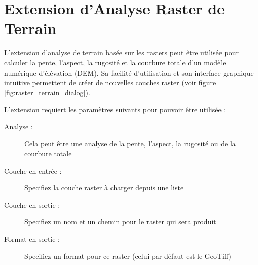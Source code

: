 
\section{Extension d'Analyse Raster de Terrain}


L'extension d'analyse de terrain basée sur les rasters peut être utilisée pour calculer la pente, l'aspect, la rugosité et la courbure totale d'un modèle numérique d'élévation (DEM). Sa facilité d'utilisation et son interface graphique intuitive permettent de créer de nouvelles couches raster (voir figure \ref{fig:raster_terrain_dialog}).

L'extension requiert les paramètres suivants pour pouvoir être utilisée :

\begin{description}
\item[Analyse :] Cela peut être une analyse de la pente, l'aspect, la rugosité ou de la courbure totale
\item[Couche en entrée :] Specifiez la couche raster à charger depuis une liste
\item[Couche en sortie :] Specifiez un nom et un chemin pour le raster qui sera produit
\item[Format en sortie :] Specifiez un format pour ce raster (celui par défaut est le GeoTiff)
\end{description}

